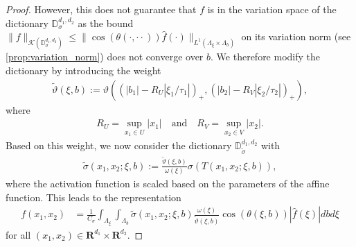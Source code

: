 \documentclass[a4paper]{article}
\newcommand{\rr}[1]{\mathbf{R}^{#1}}
\newcommand{\rrI}{\rr{d_1}}
\newcommand{\rrII}{\rr{d_2}}
\newcommand{\rrIxII}{\rrI\times\rrII}
\newcommand{\abs}[1]{| #1|}     %
\newcommand{\norm}[2]{\|#1\|_{#2}}
\numberwithin{equation}{section}
\theoremstyle{remark}
\begin{document}
\begin{proof}
    However, this does not guarantee that $f$ is
    in the variation space of the dictionary $\mathbb{D}_{\sigma}^{d_1,d_2}$
    as the bound
    $\norm{f}{\mathcal{K}(\mathbb{D}_{\sigma}^{d_1,d_2})}\leq\norm{\cos(\theta(\cdot,\cdot\cdot))\hat{f}(\cdot)}{L^1(\Lambda_\xi\times \Lambda_b)}$
    on its variation norm (see \cref{prop:variation_norm})
    does not converge over $b$.
    We therefore modify the dictionary by introducing the weight
    \begin{align*}
        \tilde{\vartheta}(\xi,b)
        :=\vartheta\left(\left(\abs{b_1}-R_U\abs{\xi_1/\tau_1}\right)_+,\left(\abs{b_2}-R_V\abs{\xi_2/\tau_2}\right)_+\right),
    \end{align*}
    where
    \begin{align}
    \label{eq:domain_radius}
        R_U=\sup_{x_1\in U}\abs{x_1}
        \quad\text{and}\quad
        R_V=\sup_{x_2\in V}\abs{x_2}.
    \end{align}
    Based on this weight, we now consider the dictionary $\mathbb{D}_{\tilde{\sigma}}^{d_1,d_2}$ with
    \begin{align}
    \label{eq:scaled_activation}
        \tilde{\sigma}(x_1,x_2;\xi,b)
        :=\frac{
            \tilde{\vartheta}(\xi,b)
        }{
            \omega(\xi)
        }
        \sigma(T\left(x_1,x_2;\xi,b\right)),
    \end{align}
    where the activation function is scaled based on the parameters of the affine function.
    This leads to the representation
    \begin{align*}
        f(x_1,x_2)
        &=\frac{1}{C_\sigma}
        \int_{\Lambda_\xi}
        \int_{\Lambda_b}
        \tilde{\sigma}(x_1,x_2;\xi,b)
        \frac{\omega(\xi)}
             {\tilde{\vartheta}(\xi,b)}
        \cos\left(\theta(\xi,b)\right)\abs{\hat{f}(\xi)}
        d b d \xi
    \end{align*}
    for all $(x_1,x_2)\in \rrIxII$.
    

\end{proof}
\end{document}
